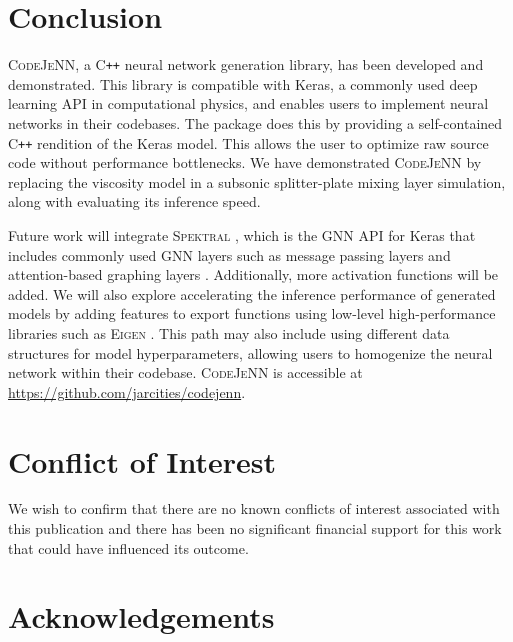 \documentclass[preprint,12pt, a4paper]{elsarticle}
\begin{document}
\section{Conclusion}
\textsc{CodeJeNN}, a C\texttt{++} neural network generation library, has been developed and demonstrated. This library is compatible with Keras, a commonly used deep learning API in computational physics, and enables users to implement neural networks in their codebases. The package does this by providing a self-contained C\texttt{++} rendition of the Keras model. This allows the user to optimize raw source code without performance bottlenecks. We have demonstrated \textsc{CodeJeNN} by replacing the viscosity model in a subsonic splitter-plate mixing layer simulation, along with evaluating its inference speed. 

Future work will integrate \textsc{Spektral} \cite{grattarola_graph_2020}, which is the GNN API for Keras that includes commonly used GNN layers such as message passing layers \cite{gilmer_neural_2017} and attention-based graphing layers \cite{thekumparampil_attention-based_2018}. Additionally, more activation functions will be added. We will also explore accelerating the inference performance of generated models by adding features to export functions using low-level high-performance libraries such as \textsc{Eigen} \cite{guennebaud_eigen_2010-1}. This path may also include using different data structures for model hyperparameters, allowing users to homogenize the neural network within their codebase. \textsc{CodeJeNN} is accessible at \url{https://github.com/jarcities/codejenn}.

\section{Conflict of Interest}


We wish to confirm that there are no known conflicts of interest associated with this publication and there has been no significant financial support for this work that could have influenced its outcome.


\section*{Acknowledgements}
\label{}
\end{document}
